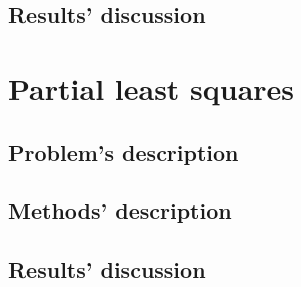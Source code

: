 \documentclass{report}
\begin{document}
\section{Results' discussion}


\chapter{Partial least squares}
\section{Problem's description}

\section{Methods' description}

\section{Results' discussion}
\end{document}
